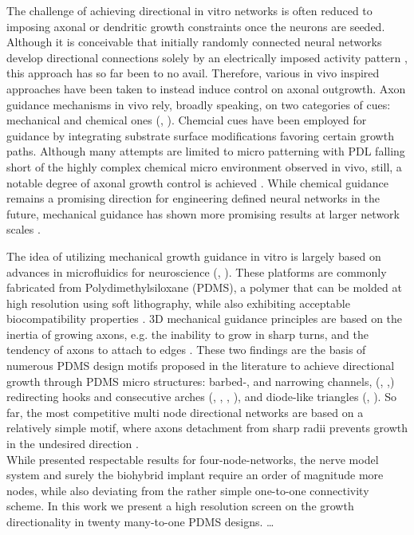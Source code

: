 The challenge of achieving directional in vitro networks is often reduced to
imposing axonal or dendritic growth constraints once the neurons are seeded.
Although it is conceivable that initially randomly connected neural networks
develop directional connections solely by an electrically imposed activity
pattern \parencite{stdp}, this approach has so far been to no avail. Therefore,
various in vivo inspired approaches have been taken to instead induce control on
axonal outgrowth. Axon guidance mechanisms in vivo rely, broadly speaking, on
two categories of cues: mechanical and chemical ones (\cite{mechanicalcues},
\cite{chemicalcues}). Chemcial cues have been employed for guidance by
integrating substrate surface modifications favoring certain growth paths.
Although many attempts are limited to micro patterning with PDL falling short of
the highly complex chemical micro environment observed in vivo, still, a notable
degree of axonal growth control is achieved \parencite{singlecellmCP}. While
chemical guidance remains a promising direction for engineering defined neural
networks in the future, mechanical guidance has shown more promising results at
larger network scales \parencite{forro}. 

The idea of utilizing mechanical growth guidance in vitro is largely based on
advances in microfluidics for neuroscience (\cite{microfludics1},
\cite{microfludics2}).  These platforms are commonly fabricated from
Polydimethylsiloxane (PDMS), a polymer that can be molded at high resolution
using soft lithography, while also exhibiting acceptable biocompatibility
properties \parencite{pdms}. 3D mechanical guidance principles are based on the
inertia of growing axons, e.g. the inability to grow in sharp turns, and the
tendency of axons to attach to edges \parencite{axongrowth3d}. These two
findings are the basis of numerous PDMS design motifs proposed in the literature
to achieve directional growth through PDMS micro structures: barbed-, and
narrowing channels, (\cite{lefeber}, \cite{peyrin},) redirecting hooks and
consecutive arches (\cite{pirlo}, \cite{na}, \cite{renault},
\cite{2019afterForro}), and diode-like triangles (\cite{gladkov},
\cite{isomura}). So far, the most competitive multi node directional networks
are based on a relatively simple motif, where axons detachment from sharp radii
prevents growth in the undesired direction \parencite{forro}. \\

While \cite{forro} presented respectable results for four-node-networks, the
nerve model system and surely the biohybrid implant require an order of
magnitude more nodes, while also deviating from the rather simple one-to-one
connectivity scheme. In this work we present a high resolution screen on the
growth directionality in twenty many-to-one PDMS designs. \dots

